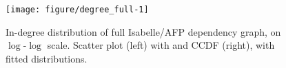 \begin{knitrout}
\color{fgcolor}\begin{figure}[!htbp]

{\centering \texttt{[image: figure/degree\_full-1]} 

}

\caption[In-degree distribution of full Isabelle/AFP dependency graph, on $\log$-$\log$ scale]{In-degree distribution of full Isabelle/AFP dependency graph, on $\log$-$\log$ scale. Scatter plot (left) with and CCDF (right), with fitted distributions.}\label{fig:degree_full}
\end{figure}

\end{knitrout}
